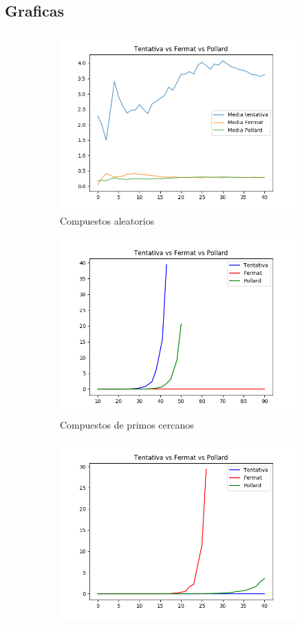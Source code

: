 \documentclass[12pt,spanish]{article}
\begin{document}
	\subsection{Graficas}
	\begin{figure}[!htbp]
			
			\begin{subfigure}{.5\textwidth}
				\centering
				\includegraphics[width=.8\linewidth]{EvolucionMedias}
				\caption{Compuestos aleatorios}
				\label{fig:sfig21}
			\end{subfigure}%
			\begin{subfigure}{.5\textwidth}
				\centering
				\includegraphics[width=.8\linewidth]{NearComp}
				\caption{Compuestos de primos cercanos}
				\label{fig:sfig22}
			\end{subfigure}
			\begin{subfigure}{.5\textwidth}
				\centering
				\includegraphics[width=.8\linewidth]{VentajaTentativa}

\end{subfigure}
\end{figure}
\end{document}
